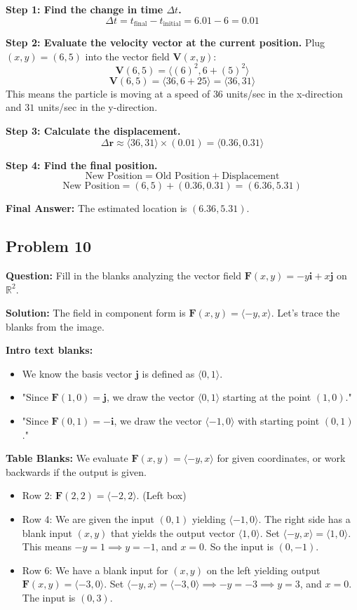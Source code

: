\documentclass[11pt]{article}
\begin{document}
\textbf{Step 1: Find the change in time $\Delta t$.}
\[ \Delta t = t_{\text{final}} - t_{\text{initial}} = 6.01 - 6 = 0.01 \]

\textbf{Step 2: Evaluate the velocity vector at the current position.}
Plug $(x, y) = (6, 5)$ into the vector field $\mathbf{V}(x, y)$:
\[ \mathbf{V}(6, 5) = \langle (6)^2, 6 + (5)^2 \rangle \]
\[ \mathbf{V}(6, 5) = \langle 36, 6 + 25 \rangle = \langle 36, 31 \rangle \]
This means the particle is moving at a speed of $36$ units/sec in the x-direction and $31$ units/sec in the y-direction.

\textbf{Step 3: Calculate the displacement.}
\[ \Delta \mathbf{r} \approx \langle 36, 31 \rangle \times (0.01) = \langle 0.36, 0.31 \rangle \]

\textbf{Step 4: Find the final position.}
\[ \text{New Position} = \text{Old Position} + \text{Displacement} \]
\[ \text{New Position} = (6, 5) + (0.36, 0.31) = (6.36, 5.31) \]

\textbf{Final Answer:} The estimated location is $(6.36, 5.31)$.

\subsection*{Problem 10}
\textbf{Question:} Fill in the blanks analyzing the vector field $\mathbf{F}(x,y) = -y\mathbf{i} + x\mathbf{j}$ on $\mathbb{R}^2$.

\textbf{Solution:}
The field in component form is $\mathbf{F}(x,y) = \langle -y, x \rangle$. Let's trace the blanks from the image.

\textbf{Intro text blanks:}
\begin{itemize}
    \item We know the basis vector $\mathbf{j}$ is defined as $\langle 0, 1 \rangle$.
    \item "Since $\mathbf{F}(1,0) = \mathbf{j}$, we draw the vector \textbf{$\langle 0, 1 \rangle$} starting at the point $(1,0)$."
    \item "Since $\mathbf{F}(0,1) = -\mathbf{i}$, we draw the vector $\langle -1, 0 \rangle$ with starting point \textbf{$(0, 1)$}."
\end{itemize}

\textbf{Table Blanks:}
We evaluate $\mathbf{F}(x,y) = \langle -y, x \rangle$ for given coordinates, or work backwards if the output is given.
\begin{itemize}
    \item Row 2: $\mathbf{F}(2, 2) = \langle -2, 2 \rangle$. (Left box)
    \item Row 4: We are given the input $(0,1)$ yielding $\langle -1,0 \rangle$. The right side has a blank input $(x,y)$ that yields the output vector $\langle 1, 0 \rangle$.
    Set $\langle -y, x \rangle = \langle 1, 0 \rangle$. This means $-y = 1 \implies y = -1$, and $x = 0$. So the input is \textbf{$(0, -1)$}.
    \item Row 6: We have a blank input for $(x,y)$ on the left yielding output $\mathbf{F}(x,y) = \langle -3, 0 \rangle$.
    Set $\langle -y, x \rangle = \langle -3, 0 \rangle \implies -y = -3 \implies y = 3$, and $x = 0$. The input is \textbf{$(0, 3)$}.
\end{itemize}
\end{document}
